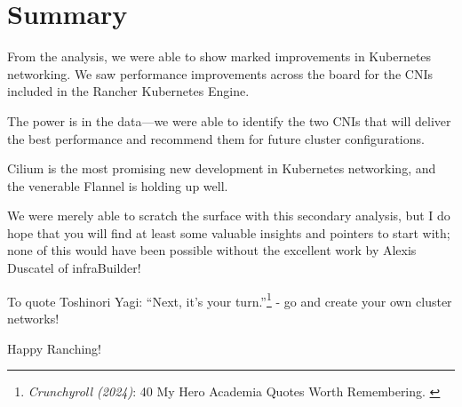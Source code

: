 %
%

\pagebreak
\section{Summary}

\onehalfspacing

From the analysis, we were able to show marked improvements in Kubernetes networking. We saw performance improvements across the board for the CNIs included in the Rancher Kubernetes Engine.

The power is in the data—we were able to identify the two CNIs that will deliver the best performance and recommend them for future cluster configurations.

Cilium is the most promising new development in Kubernetes networking, and the venerable Flannel is holding up well.

We were merely able to scratch the surface with this secondary analysis, but I do hope that you will find at least some valuable insights and pointers to start with; none of this would have been possible without the excellent work by Alexis Duscatel of infraBuilder!

To quote Toshinori Yagi: “Next, it’s your turn.”\footnote{\textit{Crunchyroll (2024)}: 40 My Hero Academia Quotes Worth Remembering. \cite{mhaQuotes}} - go and create your own cluster networks!

Happy Ranching!
